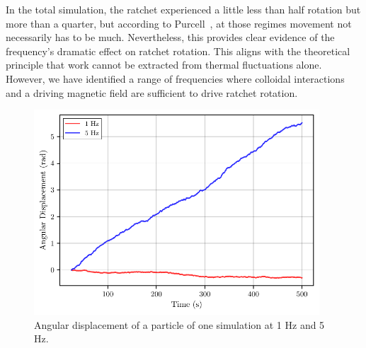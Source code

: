 In the total simulation, the ratchet experienced a little less than half rotation but more than a quarter, but according to Purcell~\cite{purcell2014life}, at those regimes movement not necessarily has to be much. Nevertheless, this provides clear evidence of the frequency's dramatic effect on ratchet rotation. This aligns with the theoretical principle that work cannot be extracted from thermal fluctuations alone. However, we have identified a range of frequencies where colloidal interactions and a driving magnetic field are sufficient to drive ratchet rotation.


\begin{figure}
  \begin{center}
    \includegraphics[width=0.95\textwidth]{figures/particle_displacement.pdf}
  \end{center}
  \caption[Angular displacement of a particle.]{Angular displacement of a particle of one simulation at 1 Hz and 5 Hz.}\label{fig:particleangulardisplacement}
\end{figure}

